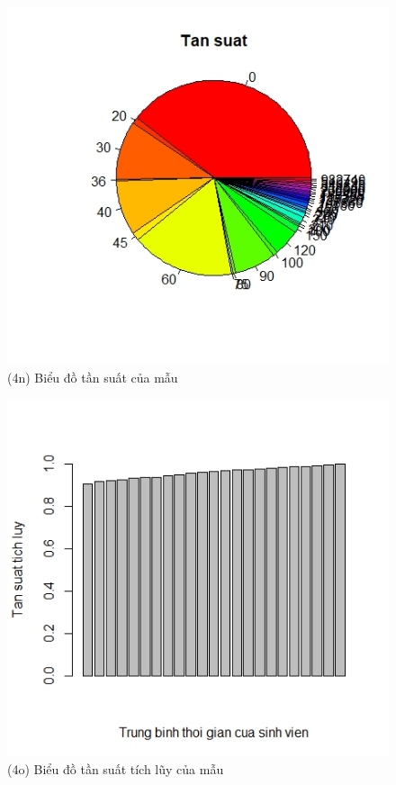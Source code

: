 \documentclass[a4paper]{article}
\theoremstyle{definition}
\begin{document}
\begin{figure}[!ht]
    \centering
    \includegraphics[scale=0.4]{Pics/q4n-file4.jpeg}
    \caption{(4n) Biểu đồ tần suất của mẫu}
    \label{fig:my_label}
\end{figure}
\newpage
\begin{figure}[!ht]
    \centering
    \includegraphics[scale=0.4]{Pics/q4o-file4.jpeg}
    \caption{(4o) Biểu đồ tần suất tích lũy của mẫu }
    \label{fig:my_label}
\end{figure}
\end{document}

